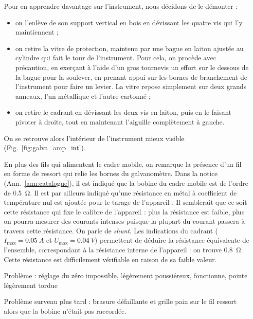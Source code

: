 \documentclass[12pt,a4paper,fleqn]{article}
\begin{document}
Pour en apprendre davantage sur l'instrument, nous décidons de le démonter :
\begin{itemize}
    \item on l'enlève de son support vertical en bois en dévissant les quatre vis qui l'y maintiennent ;
    \item on retire la vitre de protection, maintenu par une bague en laiton ajustée au cylindre qui fait le tour de l'instrument.
    Pour cela, on procède avec précaution, en exerçant à l'aide d'un gros tournevis un effort sur le dessous de la bague pour la soulever, en prenant appui sur les bornes de branchement de l'instrument pour faire un levier.
    La vitre repose simplement sur deux grands anneaux, l'un métallique et l'autre cartonné ;
    \item on retire le cadrant en dévissant les deux vis en laiton, puis en le faisant pivoter à droite, tout en maintenant l'aiguille complètement à gauche.
\end{itemize}
On se retrouve alors l'intérieur de l'instrument mieux visible (Fig.~\ref{fig:galva_amp_int}).

En plus des fils qui alimentent le cadre mobile, on remarque la présence d'un fil en forme de ressort qui relie les bornes du galvanomètre.
Dans la notice (Ann.~\ref{ann:catalogue}), il est indiqué que la bobine du cadre mobile est de l'ordre de \SI{0.5}{\ohm}.
Il est par ailleurs indiqué qu'\og une résistance en métal à coefficient de température nul est ajoutée pour le tarage de l'appareil \fg{}.
Il semblerait que ce soit cette résistance qui fixe le calibre de l'appareil : plus la résistance est faible, plus on pourra mesurer des courants intenses puisque la plupart du courant passera à travers cette résistance.
On parle de \emph{shunt}.
Les indications du cadrant ($I_\mathrm{max}=\SI{0.05}{A}$ et $U_\mathrm{max}=\SI{0.04}{V}$) permettent de déduire la résistance équivalente de l'ensemble, correspondant à la résistance interne de l'appareil : on trouve \SI{0.8}{\ohm}.
Cette résistance est difficilement vérifiable en raison de sa faible valeur.



Problème : réglage du zéro impossible, légèrement poussiéreux, fonctionne, pointe légèrement tordue

Problème survenu plus tard : brasure défaillante et grille pain sur le fil ressort alors que la bobine n'était pas raccordée.
\end{document}
